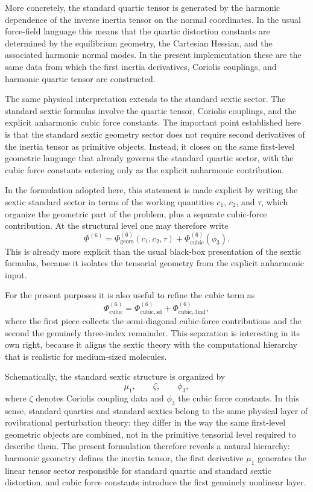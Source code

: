 \documentclass[aip,jcp,reprint,floatfix]{revtex4-2}
\begin{document}
More concretely, the standard quartic tensor is generated by the
harmonic dependence of the inverse inertia tensor on the normal
coordinates. In the usual force-field language this means that the
quartic distortion constants are determined by the equilibrium
geometry, the Cartesian Hessian, and the associated harmonic normal
modes. In the present implementation these are the same data from
which the first inertia derivatives, Coriolis couplings, and harmonic
quartic tensor are constructed.

The same physical interpretation extends to the standard sextic
sector. The standard sextic formulas involve the quartic tensor,
Coriolis couplings, and the explicit anharmonic cubic force
constants. The important point established here is that the standard
sextic geometry sector does not require second derivatives of the
inertia tensor as primitive objects. Instead, it closes on the same
first-level geometric language that already governs the standard
quartic sector, with the cubic force constants entering only as the
explicit anharmonic contribution.

In the formulation adopted here, this statement is made explicit by
writing the sextic standard sector in terms of the working quantities
$c_1$, $c_2$, and $\tau$, which organize the geometric part of the
problem, plus a separate cubic-force contribution. At the structural
level one may therefore write
\begin{equation}
\Phi^{(6)} = \Phi^{(6)}_{\mathrm{geom}}(c_1,c_2,\tau)
+ \Phi^{(6)}_{\mathrm{cubic}}(\phi_3).
\end{equation}
This is already more explicit than the usual black-box presentation of
the sextic formulas, because it isolates the tensorial geometry from
the explicit anharmonic input.

For the present purposes it is also useful to refine the cubic term as
\begin{equation}
\Phi^{(6)}_{\mathrm{cubic}}
=
\Phi^{(6)}_{\mathrm{cubic,sd}}
+
\Phi^{(6)}_{\mathrm{cubic,3ind}},
\end{equation}
where the first piece collects the semi-diagonal cubic-force
contributions and the second the genuinely three-index remainder. This
separation is interesting in its own right, because it aligns the
sextic theory with the computational hierarchy that is realistic for
medium-sized molecules.

Schematically, the standard sextic structure is organized by
\begin{equation}
\mu_1,\qquad \zeta,\qquad \phi_3,
\end{equation}
where $\zeta$ denotes Coriolis coupling data and $\phi_3$ the cubic
force constants. In this sense, standard quartics and standard sextics
belong to the same physical layer of rovibrational perturbation
theory: they differ in the way the same first-level geometric objects
are combined, not in the primitive tensorial level required to
describe them.
The present formulation therefore reveals a natural hierarchy: harmonic
geometry defines the inertia tensor, the first derivative $\mu_1$
generates the linear tensor sector responsible for standard quartic and
standard sextic distortion, and cubic force constants introduce the
first genuinely nonlinear layer.
\end{document}
